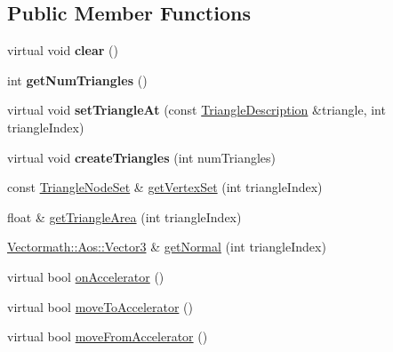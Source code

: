 \subsection*{Public Member Functions}
\begin{DoxyCompactItemize}
\item 
\mbox{\label{classbtSoftBodyTriangleData_af95b62a62097f43cff33abe975a3bf27}} 
virtual void {\bfseries clear} ()
\item 
\mbox{\label{classbtSoftBodyTriangleData_a8707741f24401c11254dff4c8567342c}} 
int {\bfseries get\+Num\+Triangles} ()
\item 
\mbox{\label{classbtSoftBodyTriangleData_a836e70484d0c58d7db818088f9543fc4}} 
virtual void {\bfseries set\+Triangle\+At} (const \hyperlink{classbtSoftBodyTriangleData_1_1TriangleDescription}{Triangle\+Description} \&triangle, int triangle\+Index)
\item 
\mbox{\label{classbtSoftBodyTriangleData_ae3110e218d2edb0805d73e124c373e05}} 
virtual void {\bfseries create\+Triangles} (int num\+Triangles)
\item 
const \hyperlink{classbtSoftBodyTriangleData_1_1TriangleNodeSet}{Triangle\+Node\+Set} \& \hyperlink{classbtSoftBodyTriangleData_a88e1d23b6229d976968fe9ad3335baa5}{get\+Vertex\+Set} (int triangle\+Index)
\item 
float \& \hyperlink{classbtSoftBodyTriangleData_a626c0aac69b35b17f2bbfc084f00a164}{get\+Triangle\+Area} (int triangle\+Index)
\item 
\hyperlink{classVectormath_1_1Aos_1_1Vector3}{Vectormath\+::\+Aos\+::\+Vector3} \& \hyperlink{classbtSoftBodyTriangleData_a4b93ad32b7b619bf99f952f7b662469d}{get\+Normal} (int triangle\+Index)
\item 
virtual bool \hyperlink{classbtSoftBodyTriangleData_a7e461faee6801a25e4ccdf108d55ed54}{on\+Accelerator} ()
\item 
virtual bool \hyperlink{classbtSoftBodyTriangleData_a64a1971c6c64d80cc8cd488cb11208a6}{move\+To\+Accelerator} ()
\item 
virtual bool \hyperlink{classbtSoftBodyTriangleData_aa89f5f9a27c9350a95179535c4aaaf8c}{move\+From\+Accelerator} ()
\item 
\mbox{\label{classbtSoftBodyTriangleData_af95b62a62097f43cff33abe975a3bf27}} 

\end{DoxyCompactItemize}
